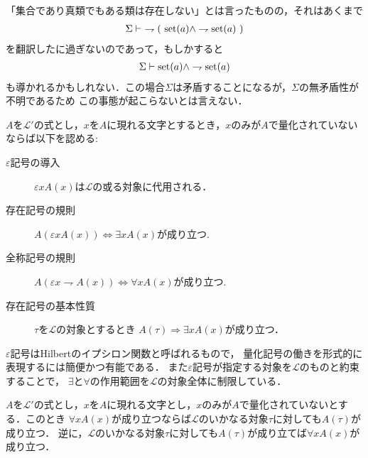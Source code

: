 	「集合であり真類でもある類は存在しない」とは言ったものの，それはあくまで
	\begin{align}
		\Sigma \vdash\ \rightharpoondown (\ \operatorname*{set} (a) \wedge \rightharpoondown \operatorname*{set} (a)\ )
	\end{align}
	を翻訳したに過ぎないのであって，もしかすると
	\begin{align}
		\Sigma \vdash \operatorname*{set} (a) \wedge \rightharpoondown \operatorname*{set} (a)
	\end{align}
	も導かれるかもしれない．この場合$\Sigma$は矛盾することになるが，$\Sigma$の無矛盾性が不明であるため
	この事態が起こらないとは言えない．
	
	\begin{screen}
		\begin{logicalaxm}[量化記号に関する規則]\label{logicalaxm:rules_of_quantifiers}
			$A$を$\mathcal{L}'$の式とし，$x$を$A$に現れる文字とするとき，$x$のみが$A$で量化されていないならば以下を認める:
			\begin{description}
				\item[$\varepsilon$記号の導入] $\varepsilon x A(x)$は$\mathcal{L}$の或る対象に代用される．
				\item[存在記号の規則] $A (\varepsilon x A(x)) \Longleftrightarrow \exists x A(x)$が成り立つ.
				\item[全称記号の規則] $A (\varepsilon x \rightharpoondown A(x)) \Longleftrightarrow \forall x A(x)$が成り立つ.
				\item[存在記号の基本性質] $\tau$を$\mathcal{L}$の対象とするとき
					$A(\tau) \Longrightarrow \exists x A(x)$が成り立つ．
			\end{description}
		\end{logicalaxm}
	\end{screen}
	
	$\varepsilon$記号はHilbertのイプシロン関数と呼ばれるもので，
	量化記号の働きを形式的に表現するには簡便かつ有能である．
	また$\varepsilon$記号が指定する対象を$\mathcal{L}$のものと約束することで，
	$\exists$と$\forall$の作用範囲を$\mathcal{L}$の対象全体に制限している．
	
	\begin{screen}
		\begin{logicalthm}[全称記号と任意性]\label{logicalthm:fundamental_law_of_universal_quantifier}
			$A$を$\mathcal{L}'$の式とし，$x$を$A$に現れる文字とし，$x$のみが$A$で量化されていないとする．このとき
			$\forall x A(x)$が成り立つならば$\mathcal{L}$のいかなる対象$\tau$に対しても$ A(\tau)$が成り立つ．
			逆に，$\mathcal{L}$のいかなる対象$\tau$に対しても$A(\tau)$が成り立てば$\forall x A(x)$が成り立つ．
		\end{logicalthm}
	\end{screen}
	
